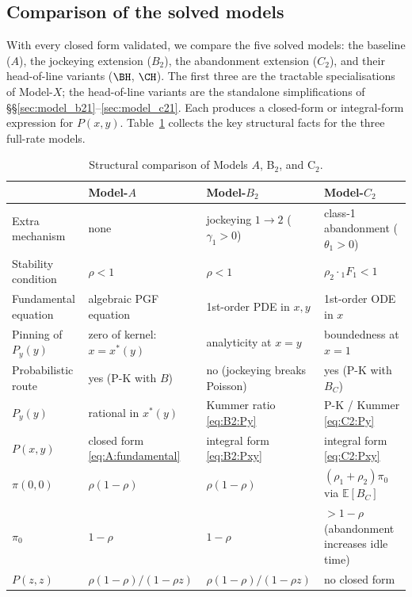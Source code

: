 \subsection{Comparison of the solved models}
\label{sec:comparison}

With every closed form validated, we compare the five solved models: the baseline ($A$), the
jockeying extension ($B_2$), the abandonment extension ($C_2$), and their head-of-line
variants ($\BH$, $\CH$). The first three are the tractable specialisations of Model-$X$;
the head-of-line variants are the standalone simplifications of
\S\S\ref{sec:model_b21}--\ref{sec:model_c21}. Each produces a closed-form or integral-form
expression for $P(x,y)$. Table~\ref{tab:comparison} collects the key structural facts for the
three full-rate models.

\begin{table}[H]
\centering
\caption{Structural comparison of Models $A$, B$_2$, and C$_2$.}
\label{tab:comparison}
\renewcommand{\arraystretch}{1.4}
\begin{tabular}{p{} p{} p{} p{}}
\hline
 & \textbf{Model-$A$} & \textbf{Model-$B_2$} & \textbf{Model-$C_2$} \\
\hline
Extra mechanism
 & none
 & jockeying $1\!\to\!2$ ($\gamma_1>0$)
 & class-1 abandonment ($\theta_1>0$) \\
Stability condition
 & $\rho<1$
 & $\rho<1$
 & $\rho_2\cdot{}_1F_1<1$ \\
Fundamental equation
 & algebraic PGF equation
 & 1st-order PDE in $x,y$
 & 1st-order ODE in $x$ \\
Pinning of $P_y(y)$
 & zero of kernel: $x=x^*(y)$
 & analyticity at $x=y$
 & boundedness at $x=1$ \\
Probabilistic route
 & yes (P-K with $B$)
 & no (jockeying breaks Poisson)
 & yes (P-K with $B_C$) \\
$P_y(y)$
 & rational in $x^*(y)$
 & Kummer ratio \eqref{eq:B2:Py}
 & P-K / Kummer \eqref{eq:C2:Py} \\
$P(x,y)$
 & closed form \eqref{eq:A:fundamental}
 & integral form \eqref{eq:B2:Pxy}
 & integral form \eqref{eq:C2:Pxy} \\
$\pi(0,0)$
 & $\rho(1-\rho)$
 & $\rho(1-\rho)$
 & $(\rho_1{+}\rho_2)\pi_0$ via $\mathbb{E}[B_C]$ \\
$\pi_0$
 & $1-\rho$
 & $1-\rho$
 & $>1-\rho$ (abandonment increases idle time) \\
$P(z,z)$
 & $\rho(1-\rho)/(1-\rho z)$
 & $\rho(1-\rho)/(1-\rho z)$
 & no closed form \\
\hline
\end{tabular}
\end{table}

